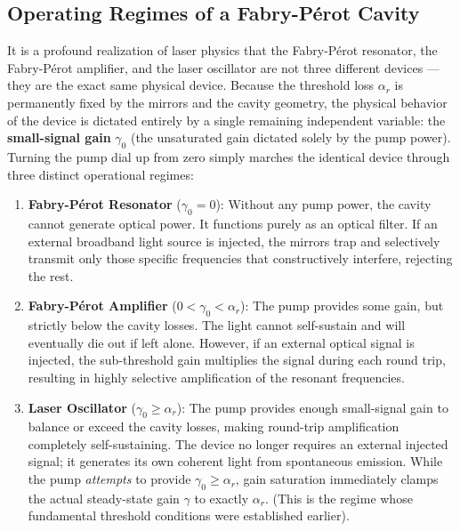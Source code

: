 \subsection{Operating Regimes of a Fabry-P\'{e}rot Cavity}

It is a profound realization of laser physics that the Fabry-P\'{e}rot resonator, the Fabry-P\'{e}rot amplifier, and the laser oscillator are not three different devices --- they are the exact same physical device. Because the threshold loss $\alpha_r$ is permanently fixed by the mirrors and the cavity geometry, the physical behavior of the device is dictated entirely by a single remaining independent variable: the \textbf{small-signal gain} $\gamma_0$ (the unsaturated gain dictated solely by the pump power). Turning the pump dial up from zero simply marches the identical device through three distinct operational regimes:

\begin{enumerate}
    \item \textbf{Fabry-P\'{e}rot Resonator} ($\gamma_0 = 0$): Without any pump power, the cavity cannot generate optical power. It functions purely as an optical filter. If an external broadband light source is injected, the mirrors trap and selectively transmit only those specific frequencies that constructively interfere, rejecting the rest.

    \item \textbf{Fabry-P\'{e}rot Amplifier} ($0 < \gamma_0 < \alpha_r$): The pump provides some gain, but strictly below the cavity losses. The light cannot self-sustain and will eventually die out if left alone. However, if an external optical signal is injected, the sub-threshold gain multiplies the signal during each round trip, resulting in highly selective amplification of the resonant frequencies.

    \item \textbf{Laser Oscillator} ($\gamma_0 \geq \alpha_r$): The pump provides enough small-signal gain to balance or exceed the cavity losses, making round-trip amplification completely self-sustaining. The device no longer requires an external injected signal; it generates its own coherent light from spontaneous emission. While the pump \emph{attempts} to provide $\gamma_0 \geq \alpha_r$, gain saturation immediately clamps the actual steady-state gain $\gamma$ to exactly $\alpha_r$. (This is the regime whose fundamental threshold conditions were established earlier).
\end{enumerate}

